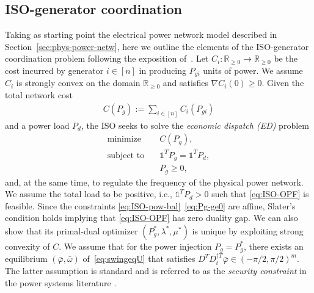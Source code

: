 \documentclass[journal]{IEEEtran}
\newcommand{\w}{\omega}
\newcommand{\1}{\mathds 1}
\newcommand{\vp}{\varphi}
\newcommand{\mysum}[1][]{#1 \sum}%
\newcommand{\realnonnegative}{{\mathbb{R}}_{\ge 0}}
\newcommand{\until}[1]{[#1]}
\newcommand{\map}[3]{#1:#2 \rightarrow #3}
\newcommand{\st}{\operatorname{subject \text{$\, \,$} to}}
\newcommand{\minimize}{\operatorname{minimize}}
\renewcommand{\l}{\lambda}
\theoremstyle{remark}
\theoremstyle{definition}
\begin{document}
\subsection{ISO-generator coordination}
Taking as starting point the electrical power network model described
in Section~\ref{sec:phys-power-netw}, here we outline the elements of
the ISO-generator coordination problem following the exposition
of~\cite{cherukuri2017iterative,cherukuri2016decentralized}.  Let
$\map{C_i}{\realnonnegative}{\realnonnegative}$ be the cost incurred
by generator $i \in \until{n}$ in producing $P_{gi}$ units of
power. We assume $C_i$ is strongly convex on the domain
$\realnonnegative$ and satisfies $\nabla C_i(0)\geq0$. Given the total
network cost
\begin{align}\label{eq:total-cost}
  C(P_g) :=\mysum_{i\in\until{n}}C_i(P_{gi})
\end{align}
and a power load $P_d$, the ISO seeks to solve the \emph{economic
dispatch (ED)} problem
%
\begin{subequations}\label{eq:ISO-OPF}
  \begin{align}
    \minimize & \quad C(P_g),
    \\
    \st & \quad \1^TP_g=\1^TP_d,\label{eq:ISO-pow-bal}
    \\
    & \quad P_g \geq 0,\label{eq:Pg-ge0}
  \end{align}
\end{subequations}
and, at the same time, to regulate the frequency of the physical power
network.  We assume the total load to be positive, i.e., $\1^TP_d>0$
such that \eqref{eq:ISO-OPF} is feasible. Since the constraints
\eqref{eq:ISO-pow-bal}~\eqref{eq:Pg-ge0} are affine, Slater's
condition holds implying that \eqref{eq:ISO-OPF} has zero duality
gap. We can also show that its primal-dual optimizer
$(P_g^*,\l^*,\mu^*)$ is unique by exploiting strong convexity of
$C$. We assume that for the power injection $P_g=P_g^*$, there exists
an equilibrium $(\bar \vp,\bar \w)$ of~\eqref{eq:swingeqU} that
satisfies $D^TD_t^{\dagger T}\bar\vp\in(-\pi/2,\pi/2)^m$. The latter
assumption is standard and is referred to as the \emph{security
  constraint} in the power systems literature \cite{powsysdynwiley}.
\end{document}
